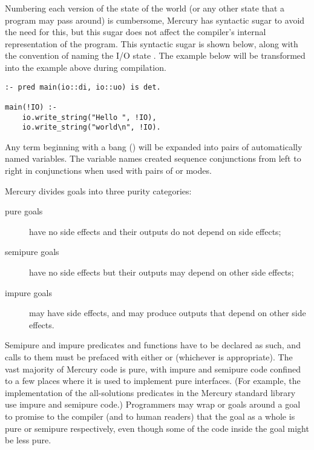 Numbering each version of the state of the world
(or any other state that a program may pass around) is cumbersome,
Mercury has syntactic sugar to avoid the need for this,
but this sugar does not affect
the compiler's internal representation of the program.
This syntactic sugar is shown below, along with the convention of naming
the I/O state .
The example below will be transformed into the example above during
compilation.

\begin{verbatim}
:- pred main(io::di, io::uo) is det.

main(!IO) :-
    io.write_string("Hello ", !IO),
    io.write_string("world\n", !IO).
\end{verbatim}

\noindent
Any term beginning with a bang (\code{!})
will be expanded into pairs of automatically named
variables.
The variable names created sequence conjunctions from left to right in
conjunctions when used with pairs of  or 
modes.

\label{page:purity}
Mercury divides goals into three purity categories:

\begin{description}

    \item[pure goals] have no side effects
    and their outputs do not depend on side effects;

    \item[semipure goals] have no side effects
    but their outputs may depend on other side effects;

    \item[impure goals] may have side effects, and may produce outputs
      that depend on other side effects.

\end{description}

\noindent
Semipure and impure predicates and functions
have to be declared as such,
and calls to them must be prefaced with either
 or  (whichever is appropriate).
The vast majority of Mercury code is pure,
with impure and semipure code confined to a few places
where it is used to implement pure interfaces.
(For example, the implementation of the all-solutions predicates
in the Mercury standard library use impure and semipure code.)
Programmers may wrap
 or  goals around a goal
to promise to the compiler (and to human readers) that
the goal as a whole is pure or semipure respectively,
even though some of the code inside the goal might be less pure.


